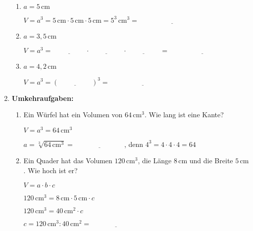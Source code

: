 \begin{enumerate}[label=\arabic*.]
    \begin{enumerate}[label=\alph*)]
        \item $a = 5\,\text{cm}$

        $V = a^3 = 5\,\text{cm} \cdot 5\,\text{cm} \cdot 5\,\text{cm} = 5^3\,\text{cm}^3 = \underline{\hspace{4cm}}$

        \vspace{0.5cm}

        \item $a = 3{,}5\,\text{cm}$

        $V = a^3 = \underline{\hspace{2cm}} \cdot \underline{\hspace{2cm}} \cdot \underline{\hspace{2cm}} = \underline{\hspace{4cm}}$

        \vspace{0.5cm}

        \item $a = 4{,}2\,\text{cm}$

        $V = a^3 = (\underline{\hspace{2cm}})^3 = \underline{\hspace{4cm}}$
    \end{enumerate}

    \vspace{1cm}

    \item \textbf{Umkehraufgaben:}
    \vspace{0.5cm}

    \begin{enumerate}[label=\alph*)]
        \item Ein Würfel hat ein Volumen von $64\,\text{cm}^3$. Wie lang ist eine Kante?

        $V = a^3 = 64\,\text{cm}^3$

        $a = \sqrt[3]{64\,\text{cm}^3} = \underline{\hspace{3cm}}$, denn $4^3 = 4 \cdot 4 \cdot 4 = 64$

        \vspace{0.5cm}

        \item Ein Quader hat das Volumen $120\,\text{cm}^3$, die Länge $8\,\text{cm}$ und die Breite $5\,\text{cm}$. Wie hoch ist er?

        $V = a \cdot b \cdot c$

        $120\,\text{cm}^3 = 8\,\text{cm} \cdot 5\,\text{cm} \cdot c$

        $120\,\text{cm}^3 = 40\,\text{cm}^2 \cdot c$

        $c = 120\,\text{cm}^3 : 40\,\text{cm}^2 = \underline{\hspace{3cm}}$
    \end{enumerate}
\end{enumerate}